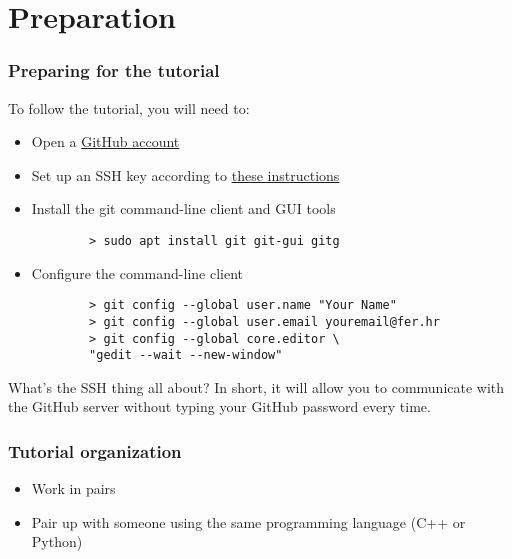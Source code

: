 \section{Preparation}

\begin{frame}[fragile]
	\frametitle{Preparing for the tutorial}
	
	To follow the tutorial, you will need to:
	\begin{itemize}
		\item  Open a \href{https://github.com/join?source=header-home}{GitHub account}
		\item Set up an SSH key according to \href{https://help.github.com/articles/adding-a-new-ssh-key-to-your-github-account/}{these instructions}
		\item Install the git command-line client and GUI tools
		\begin{verbatim}
		> sudo apt install git git-gui gitg
		\end{verbatim}
		\item Configure the command-line client
		\begin{verbatim}
		> git config --global user.name "Your Name"
		> git config --global user.email youremail@fer.hr
		> git config --global core.editor \
		"gedit --wait --new-window"
		\end{verbatim}
	\end{itemize}
	
	\begin{block}{What's the SSH thing all about?}
	In short, it will allow you to communicate with the GitHub server without typing your GitHub password every time.
	\end{block}
\end{frame}


\begin{frame}
	\frametitle{Tutorial organization}
	
	\begin{itemize}
		\item Work in pairs
		\item Pair up with someone using the same programming language (C++ or Python)
	\end{itemize}
	
\end{frame}

